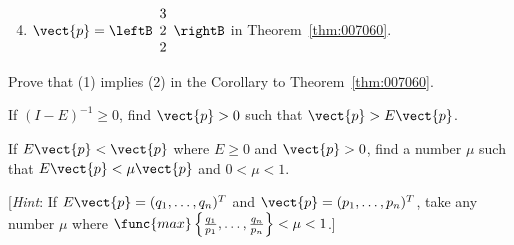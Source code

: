 \begin{multicols}{2}
\begin{ex}
\begin{sol}
\begin{enumerate}[label={\alph*.}]
\setcounter{enumi}{3}
\item  $\vect{p} = \leftB \begin{array}{r}
3 \\
2 \\
2
\end{array} \rightB$
 in Theorem~\ref{thm:007060}.

\end{enumerate}
\end{sol}
\end{ex}

\begin{ex}\label{ex:ex2_8_10}
Prove that (1) implies (2) in the Corollary to Theorem~\ref{thm:007060}.
\end{ex}

\begin{ex}\label{ex:ex2_8_11}
If $(I - E)^{-1} \geq 0$, find $\vect{p} > 0$ such that $\vect{p} > E\vect{p}$.
\end{ex}

\begin{ex}\label{ex:ex2_8_12}
If $E\vect{p} < \vect{p}$ where $E \geq 0$ and $\vect{p} > 0$, find a number $\mu$ such that $E\vect{p} < \mu\vect{p}$ and $0 < \mu < 1$.


[\textit{Hint}: If $E\vect{p} = (q_{1}, \dots, q_{n})^{T}$ and $\vect{p} = (p_{1}, \dots, p_{n})^{T}$, take any number $\mu$ where $\func{max}\left\lbrace \frac{q_{1}}{p_{1}}, \dots, \frac{q_{n}}{p_{n}} \right\rbrace < \mu < 1$.]
\end{ex}

\end{multicols}
